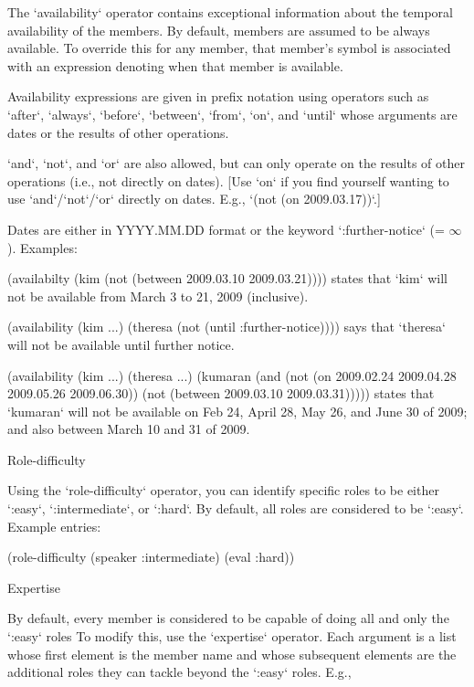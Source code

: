 The `availability` operator contains exceptional information about the
temporal availability of the members.  By default, members are assumed
to be always available.  To override this for any member, that member’s
symbol is associated with an expression denoting
when that member is available.

Availability expressions are given in prefix notation using operators
such as `after`, `always`, `before`, `between`, `from`,
`on`, and `until` whose arguments
are dates or the results of other operations.

`and`, `not`, and `or` are also allowed, but can only operate on the results of
other operations (i.e., not directly on dates).  [Use `on` if you find
yourself wanting to use `and`/`not`/`or` directly on dates.  E.g.,
`(not (on 2009.03.17))`.]

Dates are either in YYYY.MM.DD format or the keyword
`:further-notice` (= $\infty$).
Examples:

\begintt
(availabilty (kim (not (between 2009.03.10 2009.03.21))))
\endtt
states that `kim` will not be available from March 3 to 21, 2009
(inclusive).

\begintt
(availability (kim ...)
              (theresa (not (until :further-notice))))
\endtt
says that `theresa` will not be available until further notice.

\begintt
(availability (kim ...)
              (theresa ...)
              (kumaran (and (not (on 2009.02.24 2009.04.28
                                     2009.05.26 2009.06.30))
                            (not (between 2009.03.10
                                          2009.03.31)))))
\endtt
states that `kumaran` will not be available on Feb 24, April 28, May 26, and
June 30 of 2009; and also between March 10 and 31 of 2009.

\beginsection Role-difficulty

Using the `role-difficulty` operator, you can identify specific roles to
be either `:easy`, `:intermediate`, or `:hard`.  By default, all roles are
considered to be `:easy`.  Example entries:

\begintt
(role-difficulty (speaker :intermediate)
                 (eval :hard))
\endtt

\beginsection Expertise

By default, every member is considered to be capable of doing all and
only the `:easy` roles  To modify this, use the `expertise` operator.  Each
argument is a list whose first element is the member name and whose
subsequent elements are the additional roles they can tackle beyond the
`:easy` roles.  E.g.,

